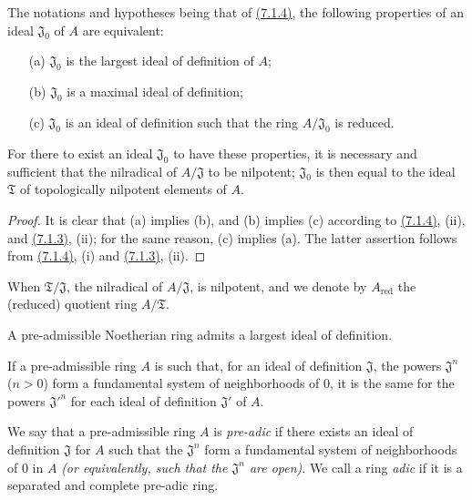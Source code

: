 \begin{cor}[7.1.6]
\label{cor-0.7.1.6}
The notations and hypotheses being that of \hyperref[prop-0.7.1.4]{(7.1.4)}, the following
properties of an ideal $\mathfrak{J}_0$ of $A$ are equivalent:
\begin{itemize}
  \item[{\rm(a)}] $\mathfrak{J}_0$ is the largest ideal of definition of $A$;
  \item[{\rm(b)}] $\mathfrak{J}_0$ is a maximal ideal of definition;
  \item[{\rm(c)}] $\mathfrak{J}_0$ is an ideal of definition such that the ring $A/\mathfrak{J}_0$
    is reduced.
\end{itemize}
For there to exist an ideal $\mathfrak{J}_0$ to have these properties, it is
necessary and sufficient that the nilradical of $A/\mathfrak{J}$ to be
nilpotent; $\mathfrak{J}_0$ is then equal to the ideal $\mathfrak{T}$ of
topologically nilpotent elements of $A$.
\end{cor}

\begin{proof}
\label{proof-cor-0.7.1.6}
It is clear that (a) implies (b), and (b) implies (c) according to
\hyperref[prop-0.7.1.4]{(7.1.4)}, (ii), and \hyperref[lem-0.7.1.3]{(7.1.3)}, (ii); for the same
reason, (c) implies (a). The latter assertion follows from \hyperref[prop-0.7.1.4]{(7.1.4)}, (i) and
\hyperref[lem-0.7.1.3]{(7.1.3)}, (ii).
\end{proof}

When $\mathfrak{T}/\mathfrak{J}$, the nilradical of $A/\mathfrak{J}$, is
nilpotent, and we denote by $A_\text{red}$ the (reduced) quotient ring
$A/\mathfrak{T}$.

\begin{cor}[7.1.7]
\label{cor-0.7.1.7}
A pre-admissible Noetherian ring admits a largest ideal of definition.
\end{cor}

\begin{cor}[7.1.8]
\label{cor-0.7.1.8}
If a pre-admissible ring $A$ is such that, for an ideal of definition
$\mathfrak{J}$, the powers $\mathfrak{J}^n$ ($n>0$) form a fundamental system
of neighborhoods of $0$, it is the same for the powers ${\mathfrak{J}'}^n$ for
each ideal of definition $\mathfrak{J}'$ of $A$.
\end{cor}

\begin{defn}[7.1.9]
\label{defn-0.7.1.9}
We say that a pre-admissible ring $A$ is {\em pre-adic} if there exists an
ideal of definition $\mathfrak{J}$ for $A$ such that the $\mathfrak{J}^n$ form
a fundamental system of neighborhoods of $0$ in $A$ {\em (or equivalently, such
that the $\mathfrak{J}^n$ are {\em open})}. We call a ring {\em adic} if it
is a separated and complete pre-adic ring.
\end{defn}

